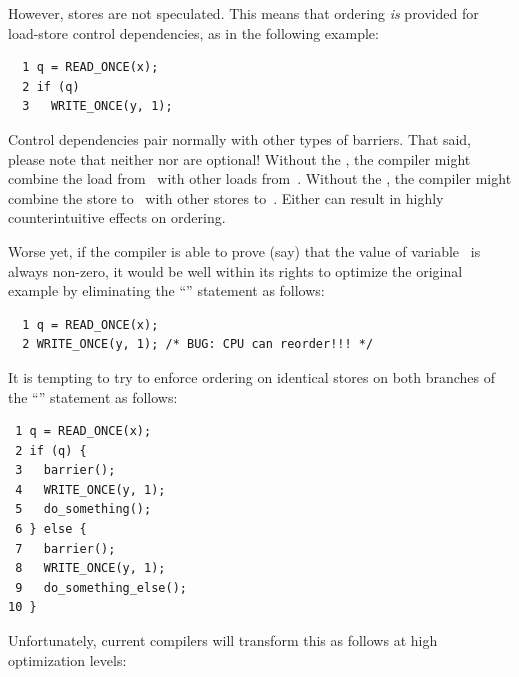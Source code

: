 However, stores are not speculated.
This means that ordering \emph{is} provided for load-store control
dependencies, as in the following example:

\vspace{5pt}
\begin{minipage}[t]{\columnwidth}
\scriptsize
\begin{verbatim}
  1 q = READ_ONCE(x);
  2 if (q)
  3   WRITE_ONCE(y, 1);
\end{verbatim}
\end{minipage}
\vspace{5pt}

Control dependencies pair normally with other types of barriers.
That said, please note that neither  nor 
are optional!
Without the , the compiler might combine the load
from~ with other loads from~.
Without the , the compiler might combine the store
to~ with other stores to~.
Either can result in highly counterintuitive effects on ordering.

Worse yet, if the compiler is able to prove (say) that the value of
variable~ is always non-zero, it would be well within its rights
to optimize the original example by eliminating the ``'' statement
as follows:

\vspace{5pt}
\begin{minipage}[t]{\columnwidth}
\scriptsize
\begin{verbatim}
  1 q = READ_ONCE(x);
  2 WRITE_ONCE(y, 1); /* BUG: CPU can reorder!!! */
\end{verbatim}
\end{minipage}
\vspace{5pt}

It is tempting to try to enforce ordering on identical stores on both
branches of the ``'' statement as follows:

\vspace{5pt}
\begin{minipage}[t]{\columnwidth}
\scriptsize
\begin{verbatim}
 1 q = READ_ONCE(x);
 2 if (q) {
 3   barrier();
 4   WRITE_ONCE(y, 1);
 5   do_something();
 6 } else {
 7   barrier();
 8   WRITE_ONCE(y, 1);
 9   do_something_else();
10 }
\end{verbatim}
\end{minipage}
\vspace{5pt}

Unfortunately, current compilers will transform this as follows at high
optimization levels:

